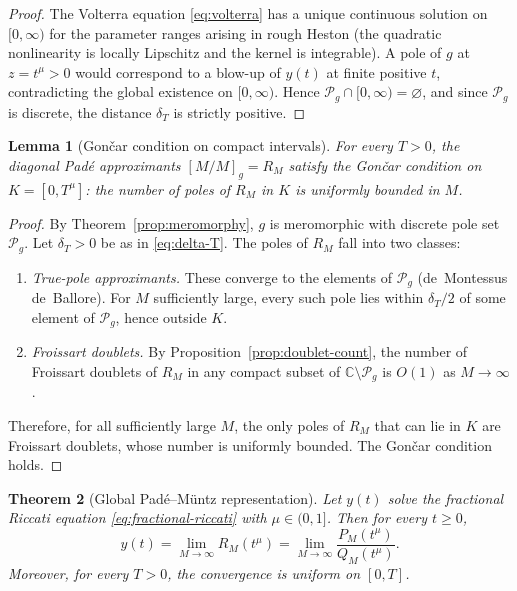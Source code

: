 \documentclass[11pt]{article}
\newtheorem{theorem}{Theorem}[section]
\newtheorem{lemma}[theorem]{Lemma}
\theoremstyle{definition}
\theoremstyle{remark}
\begin{document}
\begin{proof}
The Volterra equation \eqref{eq:volterra} has a unique continuous solution on $[0,\infty)$ for the parameter ranges arising in rough Heston (the quadratic nonlinearity is locally Lipschitz and the kernel is integrable). A pole of $g$ at $z=t^{\mu}>0$ would correspond to a blow-up of $y(t)$ at finite positive $t$, contradicting the global existence on $[0,\infty)$. Hence $\mathcal{P}_{g}\cap[0,\infty)=\varnothing$, and since $\mathcal{P}_{g}$ is discrete, the distance $\delta_{T}$ is strictly positive.
\end{proof}

\begin{lemma}[Gon\v{c}ar condition on compact intervals]
\label{lem:goncar-interval}
For every $T>0$, the diagonal Pad\'e approximants $[M/M]_{g}=R_{M}$ satisfy the Gon\v{c}ar condition on $K=[0,T^{\mu}]$: the number of poles of $R_{M}$ in $K$ is uniformly bounded in $M$.
\end{lemma}

\begin{proof}
By Theorem~\ref{prop:meromorphy}, $g$ is meromorphic with discrete pole set $\mathcal{P}_{g}$. Let $\delta_{T}>0$ be as in \eqref{eq:delta-T}. The poles of $R_{M}$ fall into two classes:
\begin{enumerate}[label=(\alph*)]
\item \emph{True-pole approximants.} These converge to the elements of $\mathcal{P}_{g}$ (de~Montessus de~Ballore). For $M$ sufficiently large, every such pole lies within $\delta_{T}/2$ of some element of $\mathcal{P}_{g}$, hence outside $K$.
\item \emph{Froissart doublets.} By Proposition~\ref{prop:doublet-count}, the number of Froissart doublets of $R_{M}$ in any compact subset of $\mathbb{C}\setminus\mathcal{P}_{g}$ is $O(1)$ as $M\to\infty$.
\end{enumerate}
Therefore, for all sufficiently large $M$, the only poles of $R_{M}$ that can lie in $K$ are Froissart doublets, whose number is uniformly bounded. The Gon\v{c}ar condition holds.
\end{proof}

\begin{theorem}[Global Pad\'e--M\"untz representation]
\label{thm:global}
Let $y(t)$ solve the fractional Riccati equation \eqref{eq:fractional-riccati} with $\mu\in(0,1]$. Then for every $t\ge 0$,
\begin{equation}
\boxed{\;y(t)=\lim_{M\to\infty}R_{M}(t^{\mu})=\lim_{M\to\infty}\frac{P_{M}(t^{\mu})}{Q_{M}(t^{\mu})}.\;}
\label{eq:global-pade}
\end{equation}
Moreover, for every $T>0$, the convergence is uniform on $[0,T]$.
\end{theorem}
\end{document}
